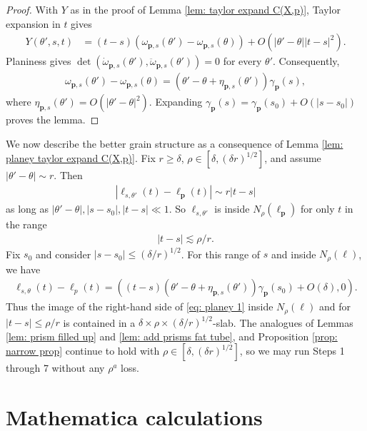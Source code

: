 \documentclass[12pt]{amsart}
\numberwithin{equation}{section}
\newcommand{\1}{\mathbbm{1}}
\newcommand{\p}{\mathbf p}
\begin{document}
\begin{proof}
    With $Y$ as in the proof of Lemma \ref{lem: taylor expand C(X,p)}, Taylor expansion in $t$ gives
    \begin{align}
        Y(\theta',s,t) &= (t-s)(\omega_{\p,s}(\theta') - \omega_{\p,s}(\theta)) + O(|\theta'-\theta||t-s|^2).
    \end{align}
    Planiness gives $\det(\dot \omega_{\p,s}(\theta'), \ddot \omega_{\p,s}(\theta')) = 0$ for every $\theta'$. Consequently, 
    \begin{align}
        \omega_{\p,s}(\theta') - \omega_{\p,s}(\theta) = (\theta'-\theta + \eta_{\p,s}(\theta')) \gamma_{\p}(s),
    \end{align}
    where $\eta_{\p,s}(\theta') = O(|\theta'-\theta|^2)$. Expanding $\gamma_\p(s) = \gamma_\p(s_0) + O(|s-s_0|)$ proves the lemma. 
\end{proof}

We now describe the better grain structure as a consequence of Lemma \ref{lem: planey taylor expand C(X,p)}. Fix $r \geq \delta$, $\rho \in [\delta, (\delta r)^{1/2}]$, and assume $|\theta' - \theta| \sim r$. Then 
\begin{align}
    |\ell_{s,\theta'}(t) - \ell_\p(t)| \sim r|t - s|
\end{align}
as long as $|\theta' - \theta|, |s -s_0|,|t-s| \ll 1$. So $\ell_{s,\theta'}$ is inside $N_\rho(\ell_\p)$ for only $t$ in the range 
\begin{align}
    |t - s| \lesssim \rho / r.
\end{align}
Fix $s_0$ and consider $|s - s_0| \leq (\delta / r)^{1/2}$. For this range of $s$ and inside $N_\rho(\ell)$, we have 
\begin{align}\label{eq: planey 1}
    \ell_{s,\theta}(t) - \ell_p(t) = ((t - s) (\theta' - \theta + \eta_{\p,s}(\theta'))\gamma_\p(s_0) + O(\delta) ,0).
\end{align}
Thus the image of the right-hand side of \eqref{eq: planey 1} inside $N_\rho(\ell)$ and for $|t - s| \leq \rho / r$ is contained in a $\delta \times \rho \times (\delta / r)^{1/2}$-slab. The analogues of Lemmas \ref{lem: prism filled up} and \ref{lem: add prisms fat tube}, and Proposition \ref{prop: narrow prop} continue to hold with $\rho \in [\delta, (\delta r)^{1/2}]$, so we may run Steps 1 through 7 without any $\rho^a$ loss. 

\section{Mathematica calculations}\label{appendix: B}
\end{document}

